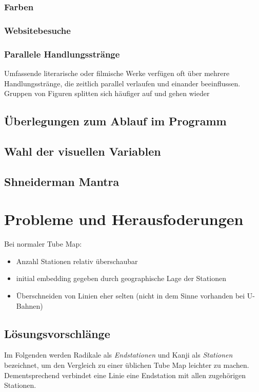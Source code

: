 \documentclass[color,german]{tudbook}
\begin{document}
\subsubsection{Farben}

\subsubsection{Websitebesuche}

\subsubsection{Parallele Handlungsstränge}

Umfassende literarische oder filmische Werke verfügen oft über mehrere Handlungsstränge, die zeitlich parallel verlaufen und einander beeinflussen. Gruppen von Figuren splitten sich häufiger auf und gehen wieder 

\subsection{Überlegungen zum Ablauf im Programm}


\subsection{Wahl der visuellen Variablen}


\subsection{Shneiderman Mantra}

\section{Probleme und Herausfoderungen}
Bei normaler Tube Map:
\begin{itemize}
\item Anzahl Stationen relativ überschaubar
\item initial embedding gegeben durch geographische Lage der Stationen
\item Überschneiden von Linien eher selten (nicht in dem Sinne vorhanden bei U-Bahnen)
\end{itemize}

\subsection{Lösungsvorschlänge}
Im Folgenden werden Radikale als \emph{Endstationen} und Kanji als \emph{Stationen} bezeichnet, um den Vergleich zu einer üblichen Tube Map leichter zu machen. Dementsprechend verbindet eine Linie eine Endstation mit allen zugehörigen Stationen.
\end{document}
